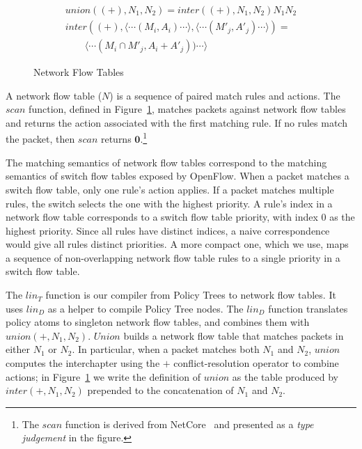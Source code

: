 \begin{figure}[t]
\begin{displaymath}
\begin{array}{l}
\mathit{union}((+),N_1,N_2) = \mathit{inter}((+),N_1,N_2) N_1 N_2 \\
\mathit{inter}((+),\langle\cdots(M_i,A_i)\cdots\rangle, \langle\cdots(M'_j,A'_j)\cdots\rangle) = \\
\qquad \langle\cdots(M_i \cap M'_j,A_i+A'_j))\cdots\rangle
\end{array}
\end{displaymath}

\caption{Network Flow Tables}
\label{f:intermediate}

\end{figure}

A network flow table ($N$) is a sequence of paired match rules
and actions. The $\mathit{scan}$ function, defined in
Figure~\ref{f:intermediate}, matches packets against network flow
tables and returns the action associated with the first matching rule. If
no rules match the packet, then $\mathit{scan}$ returns $\textbf{0}$.\footnote{The
  $\mathit{scan}$ function is derived from 
  NetCore~\cite{Monsanto:2012} and presented as a \emph{type judgement}
  in the figure.}

The matching semantics of network flow tables correspond to the
matching semantics of switch flow tables exposed by OpenFlow.  When a
packet matches a switch flow table, only one rule's action applies. If a
packet matches multiple rules, the switch selects the one with the
highest priority.  A rule's index in a network flow table corresponds
to a switch flow table priority, with index $0$ as the highest
priority. Since all rules have distinct indices, a naive
correspondence would give all rules distinct priorities. A more
compact one, which we use, maps a sequence of
non-overlapping network flow table rules to a single priority in a
switch flow table.

The $\mathit{lin}_T$ function is our compiler from Policy Trees to
network flow tables. It uses $\mathit{lin}_D$ as a helper to compile
Policy Tree nodes.  The $\mathit{lin}_D$ function translates policy
atoms to singleton network flow tables, and combines them with
$\mathit{union(+,N_1,N_2)}$.  $\mathit{Union}$ builds a network flow table that
matches packets in either $N_1$ or $N_2$. In particular, when a packet
matches both $N_1$ and $N_2$, $\mathit{union}$ computes the interchapter
using the $+$ conflict-resolution operator to combine
actions; in Figure~\ref{f:intermediate} we write the definition of
$\mathit{union}$ as the table produced by $\mathit{inter(+,N_1,N_2)}$ prepended
to the concatenation of $N_1$ and $N_2$.

